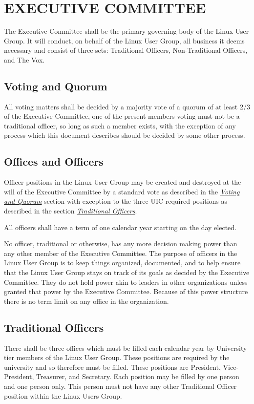 \documentclass[letter]{report}
\begin{document}
\chapter{EXECUTIVE COMMITTEE}
The Executive Committee shall be the primary governing body of the Linux User
Group. It will conduct, on behalf of the Linux User Group, all business it deems
necessary and consist of three sets: Traditional Officers, Non-Traditional
Officers, and The Vox.

\section{Voting and Quorum}
All voting matters shall be decided by a majority vote of a quorum of at least
2/3 of the Executive Committee, one of the present members voting must not be a
traditional officer, so long as such a member exists, with the exception of any
process which this document describes should be decided by some other process.

\section{Offices and Officers}
Officer positions in the Linux User Group may be created and destroyed at the
will of the Executive Committee by a standard vote as described in the
\hyperlink{section.3.1}{\textit{Voting and Quorum}} section with exception to
the three UIC required positions as described in the section
\hyperlink{section.3.3}{\textit{Traditional Officers}}.

All officers shall have a term of one calendar year starting on the day elected.

No officer, traditional or otherwise, has any more decision making power than
any other member of the Executive Committee. The purpose of officers in the
Linux User Group is to keep things organized, documented, and to help ensure
that the Linux User Group stays on track of its goals as decided by the
Executive Committee. They do not hold power akin to leaders in other
organizations unless granted that power by the Executive Committee. Because of
this power structure there is no term limit on any office in the organization.

\section{Traditional Officers}
There shall be three offices which must be filled each calendar year by
University tier members of the Linux User Group. These positions are required by
the university and so therefore must be filled. These positions are President,
Vice-President, Treasurer, and Secretary. Each position may be filled by one
person and one person only. This person must not have any other Traditional
Officer position within the Linux Users Group.
\end{document}
